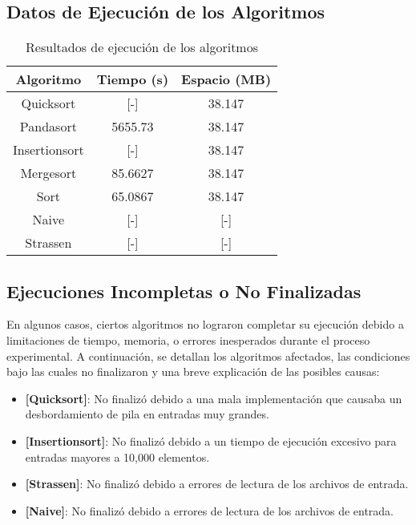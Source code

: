 \subsection*{Datos de Ejecución de los Algoritmos}

\begin{table}[H]
    \centering
    \caption{Resultados de ejecución de los algoritmos}
    \label{tab:resultados_ejecucion}
    \begin{tabular}{|c|c|c|}
        \hline
            \textbf{Algoritmo} & \textbf{Tiempo (s)} & \textbf{Espacio (MB)} \\
            \hline
            Quicksort & [-] & 38.147 \\
            \hline
            Pandasort & 5655.73 & 38.147 \\
            \hline
            Insertionsort & [-] & 38.147 \\
            \hline
            Mergesort & 85.6627 & 38.147 \\
            \hline
            Sort & 65.0867 & 38.147 \\
            \hline
            Naive & [-] & [-] \\
            \hline
            Strassen & [-] & [-] \\
            \hline
    \end{tabular}
\end{table}

\subsection*{Ejecuciones Incompletas o No Finalizadas}

En algunos casos, ciertos algoritmos no lograron completar su ejecución debido a limitaciones de tiempo, memoria, o errores inesperados durante el proceso experimental. A continuación, se detallan los algoritmos afectados, las condiciones bajo las cuales no finalizaron y una breve explicación de las posibles causas:

\begin{itemize}
    \item \textbf{[Quicksort]}: No finalizó debido a una mala implementación que causaba un desbordamiento de pila en entradas muy grandes.
    \item \textbf{[Insertionsort]}: No finalizó debido a un tiempo de ejecución excesivo para entradas mayores a 10,000 elementos.
    \item \textbf{[Strassen]}: No finalizó debido a errores de lectura de los archivos de entrada.
    \item \textbf{[Naive]}: No finalizó debido a errores de lectura de los archivos de entrada.
\end{itemize}
